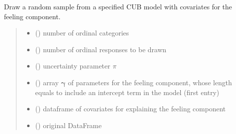 \documentclass[letterpaper,10pt,english]{sphinxmanual}
\begin{document}
\begin{fulllineitems}
\label{\detokenize{cubmods:cubmods.cub_0w.draw}}
\pysigstartsignatures
{}
\pysigstopsignatures
\sphinxAtStartPar
Draw a random sample from a specified CUB model with covariates for
the feeling component.
\begin{quote}\begin{description}
\begin{itemize}
\item {} 
\sphinxAtStartPar
{} () \textendash{} number of ordinal categories

\item {} 
\sphinxAtStartPar
{} () \textendash{} number of ordinal responses to be drawn

\item {} 
\sphinxAtStartPar
{} () \textendash{} uncertainty parameter \(\pi\)

\item {} 
\sphinxAtStartPar
{} () \textendash{} array \(\pmb \gamma\) of parameters for the feeling component, whose length equals 
 to include an intercept term in the model (first entry)

\item {} 
\sphinxAtStartPar
{} () \textendash{} dataframe of covariates for explaining the feeling component

\item {} 
\sphinxAtStartPar
{} () \textendash{} original DataFrame


\end{itemize}
\end{description}
\end{quote}
\end{fulllineitems}
\end{document}
